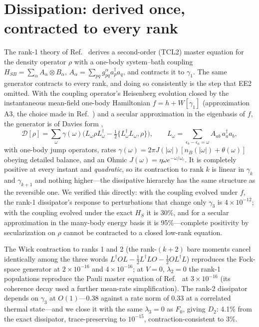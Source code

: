 \documentclass[aip,jcp,reprint,floatfix,superscriptaddress]{revtex4-2}
\newcommand{\ad}{a^\dagger}
\begin{document}
\section{Dissipation: derived once, contracted to every rank}\label{sec:bath}
The rank-1 theory of Ref.~ derives a second-order (TCL2) master equation for the density operator $\rho$ with a one-body system--bath coupling $H_{SB}=\sum_\alpha A_\alpha\otimes B_\alpha$, $A_\alpha=\sum_{pq}g^\alpha_{pq}\ad_pa_q$, and contracts it to $\gamma_1$. The same generator contracts to every rank, and doing so consistently is the step that EE2 omitted. With the coupling operator's Heisenberg evolution closed by the instantaneous mean-field one-body Hamiltonian $f=h+W[\gamma_1]$ (approximation A3, the choice made in Ref.~) and a secular approximation in the eigenbasis of $f$, the generator is of Davies form \cite{davies1974,breuer2002},
\begin{equation}
\mathcal D[\rho]=\sum_\omega\gamma(\omega)\big(L_\omega\rho L_\omega^\dagger-\tfrac12\{L_\omega^\dagger L_\omega,\rho\}\big),\qquad
L_\omega=\sum_{\epsilon_b-\epsilon_a=\omega}A_{ab}\,\ad_a a_b,
\end{equation}
with one-body jump operators, rates $\gamma(\omega)=2\pi J(|\omega|)[n_B(|\omega|)+\theta(\omega)]$ obeying detailed balance, and an Ohmic $J(\omega)=\eta\omega e^{-\omega/\omega_c}$. It is completely positive at every instant and \emph{quadratic}, so its contraction to rank $k$ is linear in $\gamma_k$ and $\gamma_{k+1}$ and nothing higher---the dissipative hierarchy has the same structure as the reversible one. We verified this directly: with the coupling evolved under $f$, the rank-1 dissipator's response to perturbations that change only $\gamma_3$ is $4\times10^{-12}$; with the coupling evolved under the exact $H_S$ it is 30\%, and for a secular approximation in the many-body energy basis it is 95\%---complete positivity by secularization on $\rho$ cannot be contracted to a closed low-rank equation.

The Wick contraction to ranks 1 and 2 (the rank-$(k+2)$ bare moments cancel identically among the three words $L^\dagger OL-\tfrac12L^\dagger LO-\tfrac12OL^\dagger L$) reproduces the Fock-space generator at $2\times10^{-16}$ and $4\times10^{-16}$; at $V=0$, $\lambda_2=0$ the rank-1 populations reproduce the Pauli master equation of Ref.~ at $3\times10^{-16}$ (its coherence decay used a further mean-rate simplification). The rank-2 dissipator depends on $\gamma_3$ at $O(1)$---0.38 against a rate norm of 0.33 at a correlated thermal state---and we close it with the same $\lambda_3=0$ as $F_0$, giving $D_2$: 4.1\% from the exact dissipator, trace-preserving to $10^{-15}$, contraction-consistent to 3\%.
\end{document}
